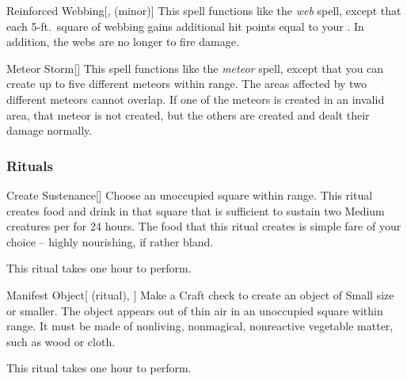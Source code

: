 \lowercase{\hypertarget{spell:Reinforced Webbing}{}}\label{spell:Reinforced Webbing}
\begin{apability}[\nth{3}]{\hypertarget{spell:Reinforced Webbing}{Reinforced Webbing}}[,  (minor)]
This spell functions like the \textit{web} spell, except that each 5-ft.\ square of webbing gains additional hit points equal to your .
In addition, the webs are no longer  to fire damage.
\end{apability}
\vspace{0.25em}



\lowercase{\hypertarget{spell:Meteor Storm}{}}\label{spell:Meteor Storm}
\begin{apability}[\nth{5}]{\hypertarget{spell:Meteor Storm}{Meteor Storm}}[]
This spell functions like the \textit{meteor} spell, except that you can create up to five different meteors within \rnglong range.
The areas affected by two different meteors cannot overlap.
If one of the meteors is created in an invalid area, that meteor is not created, but the others are created and dealt their damage normally.
\end{apability}
\vspace{0.25em}



\subsubsection{Rituals}


\lowercase{\hypertarget{spell:Create Sustenance}{}}\label{spell:Create Sustenance}
\begin{apability}[\nth{2}]{\hypertarget{spell:Create Sustenance}{Create Sustenance}}[]
Choose an unoccupied square within \rngclose range.
This ritual creates food and drink in that square that is sufficient to sustain two Medium creatures per  for 24 hours.
The food that this ritual creates is simple fare of your choice -- highly nourishing, if rather bland.

This ritual takes one hour to perform.
\end{apability}
\vspace{0.25em}



\lowercase{\hypertarget{spell:Manifest Object}{}}\label{spell:Manifest Object}
\begin{attuneability}[\nth{2}]{\hypertarget{spell:Manifest Object}{Manifest Object}}[ (ritual), ]
Make a Craft check to create an object of Small size or smaller.
The object appears out of thin air in an unoccupied square within \rngclose range.
It must be made of nonliving, nonmagical, nonreactive vegetable matter, such as wood or cloth.

This ritual takes one hour to perform.
\end{attuneability}
\vspace{0.25em}


